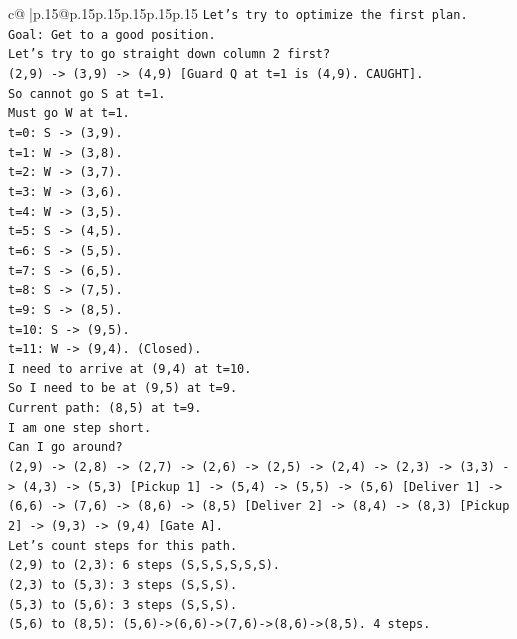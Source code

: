 \documentclass{article}
\begin{document}
{\begin{supertabular}{c@{$\;$}|p{.15\linewidth}@{}p{.15\linewidth}p{.15\linewidth}p{.15\linewidth}p{.15\linewidth}p{.15\linewidth}}
{{{\texttt{Let's try to optimize the first plan.} \\
\texttt{Goal: Get to a good position.} \\
\texttt{Let's try to go straight down column 2 first?} \\
\texttt{(2,9) {-}> (3,9) {-}> (4,9) {[}Guard Q at t=1 is (4,9). CAUGHT{]}.} \\
\texttt{So cannot go S at t=1.} \\
\texttt{Must go W at t=1.} \\
\texttt{t=0: S {-}> (3,9).} \\
\texttt{t=1: W {-}> (3,8).} \\
\texttt{t=2: W {-}> (3,7).} \\
\texttt{t=3: W {-}> (3,6).} \\
\texttt{t=4: W {-}> (3,5).} \\
\texttt{t=5: S {-}> (4,5).} \\
\texttt{t=6: S {-}> (5,5).} \\
\texttt{t=7: S {-}> (6,5).} \\
\texttt{t=8: S {-}> (7,5).} \\
\texttt{t=9: S {-}> (8,5).} \\
\texttt{t=10: S {-}> (9,5).} \\
\texttt{t=11: W {-}> (9,4). (Closed).} \\
\texttt{I need to arrive at (9,4) at t=10.} \\
\texttt{So I need to be at (9,5) at t=9.} \\
\texttt{Current path: (8,5) at t=9.} \\
\texttt{I am one step short.} \\
\texttt{Can I go around?} \\
\texttt{(2,9) {-}> (2,8) {-}> (2,7) {-}> (2,6) {-}> (2,5) {-}> (2,4) {-}> (2,3) {-}> (3,3) {-}> (4,3) {-}> (5,3) {[}Pickup 1{]} {-}> (5,4) {-}> (5,5) {-}> (5,6) {[}Deliver 1{]} {-}> (6,6) {-}> (7,6) {-}> (8,6) {-}> (8,5) {[}Deliver 2{]} {-}> (8,4) {-}> (8,3) {[}Pickup 2{]} {-}> (9,3) {-}> (9,4) {[}Gate A{]}.} \\
\texttt{Let's count steps for this path.} \\
\texttt{(2,9) to (2,3): 6 steps (S,S,S,S,S,S).} \\
\texttt{(2,3) to (5,3): 3 steps (S,S,S).} \\
\texttt{(5,3) to (5,6): 3 steps (S,S,S).} \\
\texttt{(5,6) to (8,5): (5,6){-}>(6,6){-}>(7,6){-}>(8,6){-}>(8,5). 4 steps.} \\
}}}
\end{supertabular}}
\end{document}
